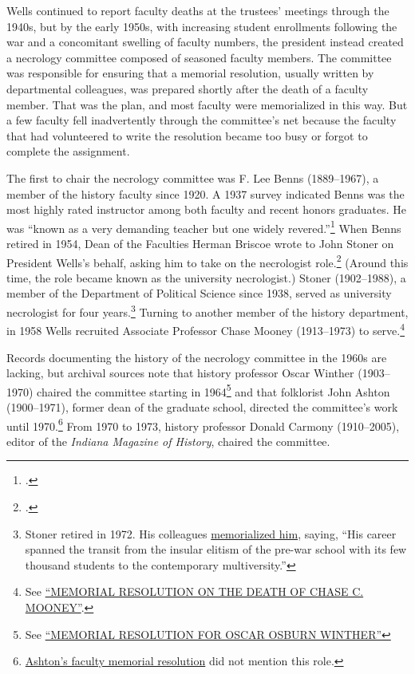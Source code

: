 \documentclass[
  american,
  letterpaper,
]{scrreprt}
\begin{document}
Wells continued to report faculty deaths at the trustees' meetings
through the 1940s, but by the early 1950s, with increasing student
enrollments following the war and a concomitant swelling of faculty
numbers, the president instead created a necrology committee composed of
seasoned faculty members. The committee was responsible for ensuring
that a memorial resolution, usually written by departmental colleagues,
was prepared shortly after the death of a faculty member. That was the
plan, and most faculty were memorialized in this way. But a few faculty
fell inadvertently through the committee's net because the faculty that
had volunteered to write the resolution became too busy or forgot to
complete the assignment.

The first to chair the necrology committee was F. Lee Benns
(1889--1967), a member of the history faculty since 1920. A 1937 survey
indicated Benns was the most highly rated instructor among both faculty
and recent honors graduates. He was ``known as a very demanding teacher
but one widely revered.''\footnote{.} When Benns retired in 1954, Dean of the Faculties Herman
Briscoe wrote to John Stoner on President Wells's behalf, asking him to
take on the necrologist role.\footnote{.}
(Around this time, the role became known as the university necrologist.)
Stoner (1902--1988), a member of the Department of Political Science
since 1938, served as university necrologist for four years.\footnote{Stoner
  retired in 1972. His colleagues
  \href{https://purl.dlib.indiana.edu/iudl/archives/bfc/B21-1990}{memorialized
  him}, saying, ``His career spanned the transit from the insular
  elitism of the pre-war school with its few thousand students to the
  contemporary multiversity.''} Turning to another member of the history
department, in 1958 Wells recruited Associate Professor Chase Mooney
(1913--1973) to serve.\footnote{See
  \href{https://purl.dlib.indiana.edu/iudl/archives/bfc/B22-1974}{``MEMORIAL
  RESOLUTION ON THE DEATH OF CHASE C. MOONEY''}.}

Records documenting the history of the necrology committee in the 1960s
are lacking, but archival sources note that history professor Oscar
Winther (1903--1970) chaired the committee starting in 1964\footnote{See
  \href{https://purl.dlib.indiana.edu/iudl/archives/bfc/B22-1971}{``MEMORIAL
  RESOLUTION FOR OSCAR OSBURN WINTHER''}} and that folklorist John
Ashton (1900--1971), former dean of the graduate school, directed the
committee's work until 1970.\footnote{\href{https://purl.dlib.indiana.edu/iudl/archives/bfc/B35-1972}{Ashton's
  faculty memorial resolution} did not mention this role.} From 1970 to
1973, history professor Donald Carmony (1910--2005), editor of the
\emph{Indiana Magazine of History}, chaired the committee.
\end{document}
